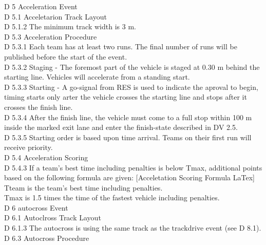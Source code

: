 \documentclass{article}
\begin{document}
D 5 Acceleration Event\\

D 5.1 Acceletarion Track Layout\\

D 5.1.2 The minimum track width is 3 m.\\

D 5.3 Acceleration Procedure\\

D 5.3.1 Each team has at least two runs. The final number of runs will be published before the start of the event.\\

D 5.3.2 Staging -  The foremost part of the vehicle is staged at 0.30 m behind the starting line. Vehicles will accelerate from a standing start.\\

D 5.3.3 Starting - A go-signal from RES is used to indicate the aproval to begin, timing starts only arter the vehicle crosses the starting line and stops after it crosses the finish line.\\

D 5.3.4 After the finish line, the vehicle must come to a full stop within 100 m inside the marked exit lane and enter the finish-state described in DV 2.5.\\

D 5.3.5 Starting order is based upon time arrival. Teams on their first run will receive priority.\\

D 5.4 Acceleration Scoring\\

D 5.4.3 If a team's best time including penalties is below Tmax, additional points based on the following formula are given: [Acceletation Scoring Formula LaTex]\\
	Tteam is the team's best time including penalties.\\
	Tmax is 1.5 times the time of the fastest vehicle including penalties.\\

D 6 autocross Event\\

D 6.1 Autoclross Track Layout\\

D 6.1.3 The autocross is using the same track as the trackdrive event (see D 8.1).\\

D 6.3 Autocross Procedure\\
\end{document}
